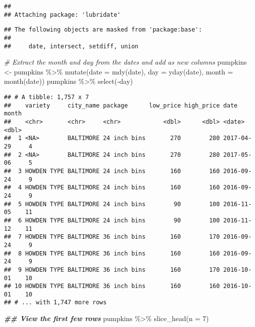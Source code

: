 \documentclass[
]{article}
\newenvironment{Shaded}{\begin{snugshade}}{\end{snugshade}}
\newcommand{\AttributeTok}[1]{\textcolor[rgb]{0.77,0.63,0.00}{#1}}
\newcommand{\CommentTok}[1]{\textcolor[rgb]{0.56,0.35,0.01}{\textit{#1}}}
\newcommand{\DecValTok}[1]{\textcolor[rgb]{0.00,0.00,0.81}{#1}}
\newcommand{\DocumentationTok}[1]{\textcolor[rgb]{0.56,0.35,0.01}{\textbf{\textit{#1}}}}
\newcommand{\FunctionTok}[1]{\textcolor[rgb]{0.00,0.00,0.00}{#1}}
\newcommand{\NormalTok}[1]{#1}
\newcommand{\OtherTok}[1]{\textcolor[rgb]{0.56,0.35,0.01}{#1}}
\newcommand{\SpecialCharTok}[1]{\textcolor[rgb]{0.00,0.00,0.00}{#1}}
\begin{document}
\begin{verbatim}
## 
## Attaching package: 'lubridate'
\end{verbatim}

\begin{verbatim}
## The following objects are masked from 'package:base':
## 
##     date, intersect, setdiff, union
\end{verbatim}

\begin{Shaded}
\begin{Highlighting}[]
\CommentTok{\# Extract the month and day from the dates and add as new columns}
\NormalTok{pumpkins }\OtherTok{\textless{}{-}}\NormalTok{ pumpkins }\SpecialCharTok{\%\textgreater{}\%}
  \FunctionTok{mutate}\NormalTok{(}\AttributeTok{date =} \FunctionTok{mdy}\NormalTok{(date),  }
         \AttributeTok{day =} \FunctionTok{yday}\NormalTok{(date),}
         \AttributeTok{month =} \FunctionTok{month}\NormalTok{(date))}
\NormalTok{pumpkins }\SpecialCharTok{\%\textgreater{}\%} 
  \FunctionTok{select}\NormalTok{(}\SpecialCharTok{{-}}\NormalTok{day)}
\end{Highlighting}
\end{Shaded}

\begin{verbatim}
## # A tibble: 1,757 x 7
##    variety     city_name package      low_price high_price date       month
##    <chr>       <chr>     <chr>            <dbl>      <dbl> <date>     <dbl>
##  1 <NA>        BALTIMORE 24 inch bins       270        280 2017-04-29     4
##  2 <NA>        BALTIMORE 24 inch bins       270        280 2017-05-06     5
##  3 HOWDEN TYPE BALTIMORE 24 inch bins       160        160 2016-09-24     9
##  4 HOWDEN TYPE BALTIMORE 24 inch bins       160        160 2016-09-24     9
##  5 HOWDEN TYPE BALTIMORE 24 inch bins        90        100 2016-11-05    11
##  6 HOWDEN TYPE BALTIMORE 24 inch bins        90        100 2016-11-12    11
##  7 HOWDEN TYPE BALTIMORE 36 inch bins       160        170 2016-09-24     9
##  8 HOWDEN TYPE BALTIMORE 36 inch bins       160        160 2016-09-24     9
##  9 HOWDEN TYPE BALTIMORE 36 inch bins       160        170 2016-10-01    10
## 10 HOWDEN TYPE BALTIMORE 36 inch bins       160        160 2016-10-01    10
## # ... with 1,747 more rows
\end{verbatim}

\begin{Shaded}
\begin{Highlighting}[]
\DocumentationTok{\#\# View the first few rows}
\NormalTok{pumpkins }\SpecialCharTok{\%\textgreater{}\%} \FunctionTok{slice\_head}\NormalTok{(}\AttributeTok{n =} \DecValTok{7}\NormalTok{)}
\end{Highlighting}
\end{Shaded}
\end{document}
